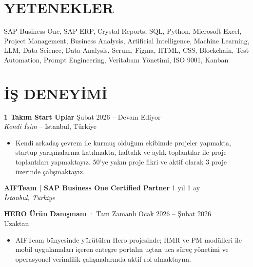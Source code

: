 \documentclass[a4paper,8pt]{article}
\begin{document}
\section{YETENEKLER}
{\small SAP Business One, SAP ERP, Crystal Reports, SQL, Python, Microsoft Excel, Project Management, Business Analysis, Artificial Intelligence, Machine Learning, LLM, Data Science, Data Analysis, Scrum, Figma, HTML, CSS, Blockchain, Test Automation, Prompt Engineering, Veritabanı Yönetimi, ISO 9001, Kanban}

\section{İŞ DENEYİMİ}

\textbf{1 Takım Start Uplar} \hfill {\small Şubat 2026 -- Devam Ediyor}\\
{\small \textit{Kendi İşim} -- İstanbul, Türkiye}
\begin{itemize}
\item {\small Kendi arkadaş çevrem ile kurmuş olduğum ekibimde projeler yapmakta, startup yarışmalarına katılmakta, haftalık ve aylık toplantılar ile proje toplantıları yapmaktayız. 50'ye yakın proje fikri ve aktif olarak 3 proje üzerinde çalışmaktayız.}
\end{itemize}

\vspace{0pt}

\textbf{AIFTeam | SAP Business One Certified Partner} \hfill {\small 1 yıl 1 ay}\\
{\small \textit{İstanbul, Türkiye}}

\vspace{0pt}
{\small \textbf{HERO Ürün Danışmanı} · Tam Zamanlı \hfill Ocak 2026 -- Şubat 2026}\\
{\small Uzaktan}
\begin{itemize}
\item {\small AIFTeam bünyesinde yürütülen Hero projesinde; HMR ve PM modülleri ile mobil uygulamaları içeren entegre portalın uçtan uca süreç yönetimi ve operasyonel verimlilik çalışmalarında aktif rol almaktayım.}
\end{itemize}
\end{document}
